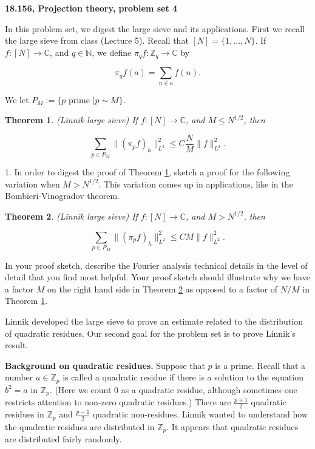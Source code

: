 \documentclass{amsart}
\newtheorem{theorem}{Theorem}
\newcommand{\NN}{\mathbb{N}}
\newcommand{\CC}{\mathbb{C}}
\newcommand{\ZZ}{\mathbb{Z}}
\begin{document}
{\bf  18.156, Projection theory,  problem set 4}

\vskip10pt

In this problem set,  we digest the large sieve and its applications.   First we recall the large sieve from class (Lecture 5).  Recall that $[N] = \{1, ..., N\}$.   If $f: [N] \rightarrow \CC$,  and $q \in \NN$,  we define $\pi_q f: \ZZ_q \rightarrow \CC$ by

$$ \pi_q f(a) = \sum_{n \in a} f(n). $$

We let $P_M:= \{ p \textrm{ prime } | p \sim M \}$.  

\begin{theorem} \label{largesieve} (Linnik large sieve) If $f: [N] \rightarrow \CC$,  and $M \le N^{1/2}$,  then

$$ \sum_{p \in P_M} \| (\pi_p f)_h \|_{L^2}^2 \le C \frac{N}{M} \| f \|_{L^2}^2. $$

\end{theorem}

1.    In order to digest the proof of Theorem \ref{largesieve},  sketch a proof for the following variation when $M > N^{1/2}$.   This variation comes up in applications, like in the Bombieri-Vinogradov theorem.


\begin{theorem} \label{largesieve2} (Linnik large sieve) If $f: [N] \rightarrow \CC$,  and $M > N^{1/2}$,  then

$$ \sum_{p \in P_M} \| (\pi_p f)_h \|_{L^2}^2 \le C  M \| f \|_{L^2}^2. $$

\end{theorem}

In your proof sketch,  describe the Fourier analysis technical details in the level of detail that you find most helpful.   Your proof sketch should illustrate why we have a factor $M$ on the right hand side in Theorem \ref{largesieve2} as opposed to a factor of $N/M$ in Theorem \ref{largesieve}.

\vskip10pt

Linnik developed the large sieve to prove an estimate related to the distribution of quadratic residues.  Our second goal for the problem set is to prove Linnik's result.

\vskip10pt

{\bf Background on quadratic residues.}  Suppose that $p$ is a prime.   Recall that a number $a \in \ZZ_p$ is called a quadratic residue if there is a solution to the equation $b^2 = a$ in $\ZZ_p$.    (Here we count 0 as a quadratic residue,  although sometimes one restricts attention to non-zero quadratic residues.)   There are $\frac{p+1}{2}$ quadratic residues in $\ZZ_p$ and $\frac{p-1}{2}$ quadratic non-residues.   Linnik wanted to understand how the quadratic residues are distributed in $\ZZ_p$.   It appears that quadratic residues are distributed fairly randomly.   
\end{document}
